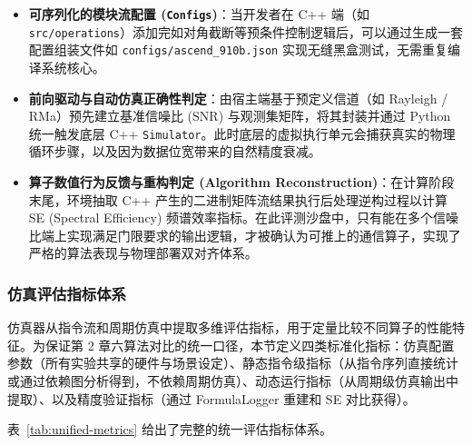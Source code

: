 \documentclass{CjC}
\begin{document}
    \begin{itemize}
        \item \textbf{可序列化的模块流配置 (\texttt{Configs})}：当开发者在 C++ 端（如
            \texttt{src/operations}）添加完如对角截断等预条件控制逻辑后，可以通过生成一套配置组装文件如
            \texttt{configs/ascend\_910b.json}
            实现无缝黑盒测试，无需重复编译系统核心。

        \item \textbf{前向驱动与自动仿真正确性判定}：由宿主端基于预定义信道（如 Rayleigh
            / RMa）预先建立基准信噪比 (SNR) 与观测集矩阵，将其封装并通过 Python 统一触发底层
            C++ \texttt{Simulator}。此时底层的虚拟执行单元会捕获真实的物理循环步骤，以及因为数据位宽带来的自然精度衰减。

        \item \textbf{算子数值行为反馈与重构判定 (Algorithm Reconstruction)}：在计算阶段末尾，环境抽取
            C++ 产生的二进制矩阵流结果执行后处理逆构过程以计算 SE (Spectral
            Efficiency) 频谱效率指标。在此评测沙盘中，只有能在多个信噪比端上实现满足门限要求的输出逻辑，才被确认为可推上的通信算子，实现了严格的算法表现与物理部署双对齐体系。
    \end{itemize}

    \subsubsection{仿真评估指标体系}

仿真器从指令流和周期仿真中提取多维评估指标，用于定量比较不同算子的性能特征。为保证第 2 章六算法对比的统一口径，本节定义四类标准化指标：仿真配置参数（所有实验共享的硬件与场景设定）、静态指令级指标（从指令序列直接统计或通过依赖图分析得到，不依赖周期仿真）、动态运行指标（从周期级仿真输出中提取）、以及精度验证指标（通过 FormulaLogger 重建和 SE 对比获得）。

表~\ref{tab:unified-metrics} 给出了完整的统一评估指标体系。
\end{document}
